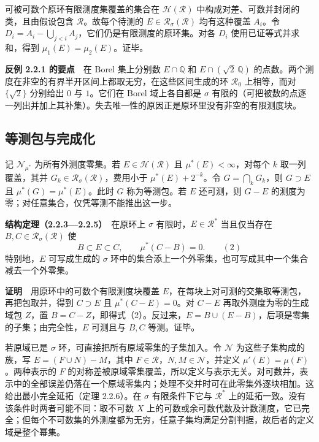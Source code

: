 \documentclass[11pt,a4paper]{article}
\begin{document}
可被可数个原环有限测度集覆盖的集合在 \(\mathcal H(\mathcal R)\) 中构成对差、可数并封闭的类，且由假设包含 \(\mathcal R\)。故每个待测的 \(E\in\mathcal R_\sigma(\mathcal R)\) 均有这种覆盖 \(A_i\)。令 \(D_i=A_i-\bigcup_{j<i}A_j\)，它们仍是有限测度的原环集。对各 \(D_i\) 使用已证等式并求和，得到 \(\mu_1(E)=\mu_2(E)\)。证毕。

\textbf{反例 2.2.1 的要点}　在 Borel 集上分别数 \(E\cap\mathbb Q\) 和 \(E\cap(\sqrt2\,\mathbb Q)\) 的点数。两个测度在非空的有界半开区间上都取无穷，在这些区间生成的环 \(\mathcal R_0\) 上相等，而对 \(\{\sqrt2\}\) 分别给出 \(0\) 与 \(1\)。它们在 Borel 域上各自都是 \(\sigma\) 有限的（可把被数的点逐一列出并加上其补集）。失去唯一性的原因正是原环里没有非空的有限测度块。

\subsection*{等测包与完成化}\label{ux7b49ux6d4bux5305ux4e0eux5b8cux6210ux5316}

记 \(\mathcal N_{\mu^*}\) 为所有外测度零集。若 \(E\in\mathcal H(\mathcal R)\) 且 \(\mu^*(E)<\infty\)，对每个 \(k\) 取一列覆盖，其并 \(G_k\in\mathcal R_\sigma(\mathcal R)\)，费用小于 \(\mu^*(E)+2^{-k}\)。令 \(G=\bigcap_k G_k\)，则 \(G\supset E\) 且 \(\mu^*(G)=\mu^*(E)\)。此时 \(G\) 称为等测包。若 \(E\) 还可测，则 \(G-E\) 的测度为零；对任意集合，仅凭等测不能推出这一步。

\textbf{结构定理（2.2.3---2.2.5）}　在原环上 \(\sigma\) 有限时，\(E\in\mathcal R^*\) 当且仅当存在 \(B,C\in\mathcal R_\sigma(\mathcal R)\) 使 \[
B\subset E\subset C,\qquad \mu^*(C-B)=0. \qquad (2)
\] 特别地，\(E\) 可写成生成的 \(\sigma\) 环中的集合添上一个外零集，也可写成其中一个集合减去一个外零集。

\textbf{证明}　用原环中的可数个有限测度块覆盖 \(E\)，在每块上对可测的交集取等测包，再把包取并，得到 \(C\supset E\) 且 \(\mu^*(C-E)=0\)。对 \(C-E\) 再取外测度为零的生成域包 \(Z\)，置 \(B=C-Z\)，即得式（2）。反过来，\(E=B\cup(E-B)\)，后项是零集的子集；由完全性，\(E\) 可测且与 \(B,C\) 等测。证毕。

若原域已是 \(\sigma\) 环，可直接把所有原域零集的子集加入。令 \(\mathcal N\) 为这些子集构成的族，写 \(E=(F\cup N)-M\)，其中 \(F\in\mathcal R\)，\(N,M\in\mathcal N\)，并定义 \(\mu'(E)=\mu(F)\)。两种表示的 \(F\) 的对称差被原域零集覆盖，所以定义与表示无关。对可数并，表示中的全部误差仍落在一个原域零集内；处理不交并时可在此零集外逐块相加。这给出最小完全延拓（定理 2.2.6）。在 \(\sigma\) 有限条件下它与 \(\mathcal R^*\) 上的延拓一致。没有该条件时两者可能不同：取不可数 \(X\) 上的可数或余可数代数及计数测度，它已完全；但每个不可数集的外测度都为无穷，任意子集均满足分割判据，故后者的定义域是整个幂集。
\end{document}

